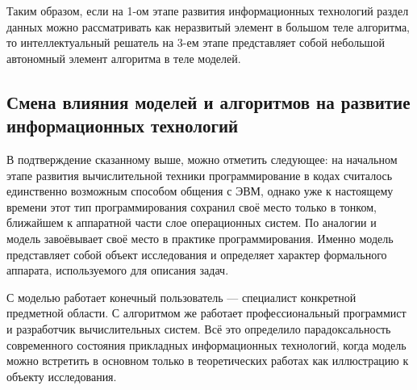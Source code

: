 Таким образом, если на 1-ом этапе развития информационных технологий
раздел данных можно рассматривать как неразвитый элемент в большом
теле алгоритма, то интеллектуальный решатель на 3-ем этапе
представляет собой небольшой автономный элемент алгоритма в теле моделей.


\subsection{\label{sec:models_and_algorithms}Смена влияния моделей и алгоритмов на развитие
  информационных технологий}

В подтверждение сказанному выше, можно отметить следующее: на
начальном этапе развития вычислительной техники программирование в
кодах считалось единственно возможным способом общения с ЭВМ, однако
уже к настоящему времени этот тип программирования сохранил своё место
только в тонком, ближайшем к аппаратной части слое операционных
систем. По аналогии и модель завоёвывает своё место в практике
программирования. Именно модель представляет собой объект исследования
и определяет характер формального аппарата, используемого для описания
задач.

С моделью работает конечный пользователь --- специалист конкретной
предметной области. С алгоритмом же работает профессиональный
программист и разработчик вычислительных систем. Всё это определило
парадоксальность современного состояния прикладных информационных
технологий, когда модель можно встретить в основном только в
теоретических работах как иллюстрацию к объекту исследования.


